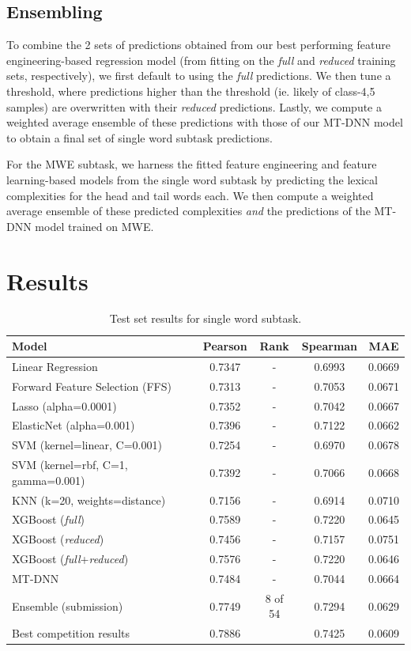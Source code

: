\documentclass[11pt,a4paper]{article}
\begin{document}
\subsection{Ensembling}

To combine the 2 sets of predictions obtained from our best performing feature engineering-based regression model (from fitting on the \textit{full} and \textit{reduced} training sets, respectively), we first default to using the \textit{full} predictions. We then tune a threshold, where predictions higher than the threshold (ie. likely of class-4,5 samples) are overwritten with their \textit{reduced} predictions. Lastly, we compute a weighted average ensemble of these predictions with those of our MT-DNN model to obtain a final set of single word subtask predictions. 

For the MWE subtask, we harness the fitted feature engineering and feature learning-based models from the single word subtask by predicting the lexical complexities for the head and tail words each. We then compute a weighted average ensemble of these predicted complexities \textit{and} the predictions of the MT-DNN model trained on MWE.

\section{Results}

\begin{table}[t]
  \centering
  \begin{tabular}{lcccc}
  \hline \textbf{Model} & \textbf{Pearson} & \textbf{Rank} & \textbf{Spearman} & \textbf{MAE} \\ \hline
  Linear Regression	& 0.7347 & - &	0.6993 &	0.0669 \\
  Forward Feature Selection (FFS)	& 0.7313 & - &	0.7053 & 0.0671 \\
  Lasso (alpha=0.0001) &	0.7352 & - &	0.7042 & 	0.0667 \\
  ElasticNet (alpha=0.001) &	0.7396 & - &	0.7122 &	0.0662 \\
  SVM (kernel=linear, C=0.001) &	0.7254 & - &	0.6970 &	0.0678 \\
  SVM (kernel=rbf, C=1, gamma=0.001) &	0.7392 & - &	0.7066 &	0.0668 \\
  KNN (k=20, weights=distance) &	0.7156 & -	& 0.6914 &	0.0710 \\
  \hline
  XGBoost (\textit{full}) &	0.7589 & - &	0.7220 &	0.0645 \\
  XGBoost (\textit{reduced}) &	0.7456 & - &	0.7157 &	0.0751 \\
  XGBoost (\textit{full}+\textit{reduced}) & 0.7576 & - & 0.7220 & 0.0646 \\
  MT-DNN & 0.7484 & -	& 0.7044 & 0.0664 \\
  Ensemble (submission) & 0.7749 & 8 of 54 & 0.7294 & 0.0629 \\
  \hline
  Best competition results & 0.7886 & & 0.7425 & 0.0609 \\ 
  \hline
  \end{tabular}
  \caption{\label{tab:single-word-results} Test set results for single word subtask. }
\end{table}
\end{document}
